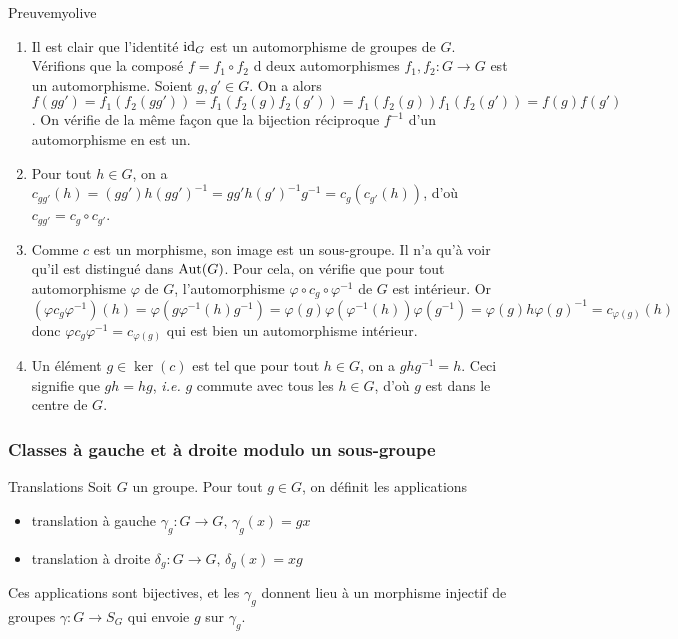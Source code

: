     \begin{demo}{Preuve}{myolive}
        \begin{enumerate}
            \item Il est clair que l’identité $\operatorname{id}_G$ est un automorphisme de groupes de $G$. Vérifions que la composé $f = f_1 \circ f_2$ d deux automorphismes $f_1,f_2 : G \to G$ est un automorphisme. Soient $g,g' \in G$. On a alors $f(gg') = f_1(f_2(gg')) = f_1(f_2(g)f_2(g')) = f_1(f_2(g))f_1(f_2(g')) = f(g)f(g')$. On vérifie de la même façon que la bijection réciproque $f^{-1}$ d’un automorphisme en est un.
            \item Pour tout $h \in G$, on a $c_{gg'}(h) = (gg') h (gg')^{-1} = gg' h (g')^{-1} g^{-1} = c_g (c_{g'}(h))$, d’où $c_{gg'} = c_g \circ c_{g'}$.
            \item Comme $c$ est un morphisme, son image est un sous-groupe. Il n’a qu’à voir qu’il est distingué dans $\operatorname{Aut}(G)$. Pour cela, on vérifie que pour tout automorphisme $\varphi$ de $G$, l’automorphisme $\varphi \circ c_g \circ \varphi^{-1}$ de $G$ est intérieur. Or 
            \[ (\varphi c_g \varphi^{-1})(h) = \varphi(g \varphi^{-1}(h)g^{-1}) = \varphi(g) \varphi(\varphi^{-1}(h)) \varphi(g^{-1}) = \varphi(g) h \varphi(g)^{-1} = c_{\varphi(g)}(h) \]    
            donc $\varphi c_g \varphi^{-1} = c_{\varphi(g)}$ qui est bien un automorphisme intérieur.
            \item Un élément $g \in \ker(c)$ est tel que pour tout $h \in G$, on a $g h g^{-1} = h$. Ceci signifie que $gh = hg$, \textit{i.e.} $g$ commute avec tous les $h \in G$, d’où $g$ est dans le centre de $G$.
        \end{enumerate}
    \end{demo}

    \subsubsection{Classes à gauche et à droite modulo un sous-groupe}

    \begin{defitheo}{Translations}{}
        Soit $G$ un groupe. Pour tout $g \in G$, on définit les applications 
        \begin{itemize}
            \item translation à gauche $\gamma_g : G \to G, \, \gamma_g(x) = gx$
            \item translation à droite $\delta_g : G \to G, \, \delta_g(x) = xg$
        \end{itemize}
        Ces applications sont bijectives, et les $\gamma_g$ donnent lieu à un morphisme injectif de groupes $\gamma : G \to S_G$ qui envoie $g$ sur $\gamma_g$.
    \end{defitheo}

